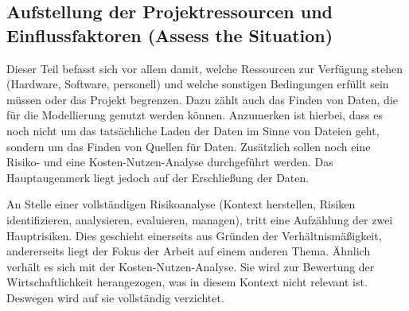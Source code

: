\subsection{Aufstellung der Projektressourcen und Einflussfaktoren (Assess the Situation)} \label{subsec:assesTheSituation}
Dieser Teil befasst sich vor allem damit, welche Ressourcen zur Verfügung stehen (Hardware, Software, personell) und welche sonstigen Bedingungen erfüllt sein müssen oder das Projekt begrenzen. Dazu zählt auch das Finden von Daten, die für die Modellierung genutzt werden können. Anzumerken ist hierbei, dass es noch nicht um das tatsächliche Laden der Daten im Sinne von Dateien geht, sondern um das Finden von Quellen für Daten. Zusätzlich sollen noch eine Risiko- und eine Kosten-Nutzen-Analyse durchgeführt werden. Das Hauptaugenmerk liegt jedoch auf der Erschließung der Daten. 
\par
An Stelle einer vollständigen Risikoanalyse (Kontext herstellen, Risiken identifizieren, analysieren, evaluieren, managen\citep[S.~43]{sowa_management_2017}), tritt eine Aufzählung der zwei Hauptrisiken. Dies geschieht einerseits aus Gründen der Verhältnismäßigkeit, andererseits liegt der Fokus der Arbeit auf einem anderen Thema. Ähnlich verhält es sich mit der Kosten-Nutzen-Analyse. Sie wird zur Bewertung der Wirtschaftlichkeit herangezogen, was in diesem Kontext nicht relevant ist. Deswegen wird auf sie vollständig verzichtet.

